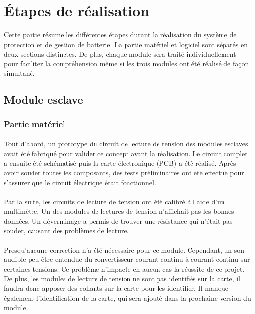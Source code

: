 \section{Étapes de réalisation}

	\paragraph{}
	Cette partie résume les différentes étapes durant la réalisation du système de protection et de gestion de batterie. La partie matériel et logiciel sont séparés en deux sections distinctes. De plus, chaque module sera traité individuellement pour faciliter la compréhension même si les trois modules ont été réalisé de façon simultané. 

	\subsection{Module esclave}
	
		\subsubsection{Partie matériel}	
		
			\paragraph{}
			Tout d’abord, un prototype du circuit de lecture de tension des modules esclaves avait été fabriqué pour valider ce concept avant la réalisation. Le circuit complet a ensuite été schématisé puis la carte électronique (PCB) a été réalisé. Après avoir souder toutes les composants, des tests préliminaires ont été effectué pour s’assurer que le circuit électrique était fonctionnel.
			
			\paragraph{}			
			Par la suite, les circuits de lecture de tension ont été calibré à l’aide d’un multimètre. Un des modules de lectures de tension n’affichait pas les bonnes données. Un déverminage a permis de trouver une résistance qui n’était pas souder, causant des problèmes de lecture. 
			
			\paragraph{}			
			Presqu’aucune correction n’a été nécessaire pour ce module. Cependant, un son audible peu être entendue du convertisseur courant continu à courant continu sur certaines tensions. Ce problème n’impacte en aucun cas la réussite de ce projet. De plus, les modules de lecture de tension ne sont pas identifiés sur la carte, il faudra donc apposer des collants sur la carte pour les identifier. Il manque également l’identification de la carte, qui sera ajouté dans la prochaine version du module.

